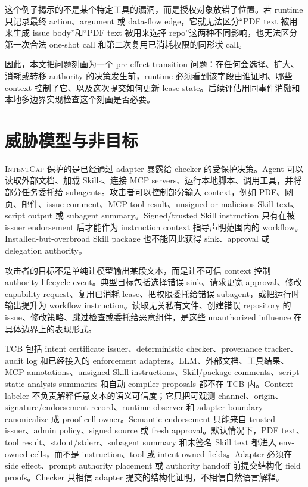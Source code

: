 \documentclass[UTF8,a4paper,11pt]{ctexart}
\newcommand{\sys}{\textsc{IntentCap}\xspace}
\begin{document}
这个例子揭示的不是某个特定工具的漏洞，而是授权对象放错了位置。若 runtime 只记录最终 action、argument 或 data-flow edge，它就无法区分“PDF text 被用来生成 issue body”和“PDF text 被用来选择 repo”这两种不同影响，也无法区分第一次合法 one-shot call 和第二次复用已消耗权限的同形状 call。

因此，本文把问题刻画为一个 pre-effect transition 问题：在任何会选择、扩大、消耗或转移 authority 的决策发生前，runtime 必须看到该字段由谁证明、哪些 context 控制了它、以及这次提交如何更新 lease state。后续评估用同事件消融和本地多边界实现检查这个刻画是否必要。

\section{威胁模型与非目标}

\sys 保护的是已经通过 adapter 暴露给 checker 的受保护决策。Agent 可以读取外部文档、加载 Skills、连接 MCP servers、运行本地脚本、调用工具，并将部分任务委托给 subagents。攻击者可以控制部分输入 context，例如 PDF、网页、邮件、issue comment、MCP tool result、unsigned or malicious Skill text、script output 或 subagent summary。Signed/trusted Skill instruction 只有在被 issuer endorsement 后才能作为 instruction context 指导声明范围内的 workflow。Installed-but-overbroad Skill package 也不能因此获得 sink、approval 或 delegation authority。

攻击者的目标不是单纯让模型输出某段文本，而是让不可信 context 控制 authority lifecycle event。典型目标包括选择错误 sink、请求更宽 approval、修改 capability request、复用已消耗 lease、把权限委托给错误 subagent，或把运行时输出提升为 workflow instruction。读取无关私有文件、创建错误 repository 的 issue、修改策略、跳过检查或委托给恶意组件，是这些 unauthorized influence 在具体边界上的表现形式。

TCB 包括 intent certificate issuer、deterministic checker、provenance tracker、audit log 和已经接入的 enforcement adapters。LLM、外部文档、工具结果、MCP annotations、unsigned Skill instructions、Skill/package comments、script static-analysis summaries 和自动 compiler proposals 都不在 TCB 内。Context labeler 不负责解释任意文本的语义可信度；它只把可观测 channel、origin、signature/endorsement record、runtime observer 和 adapter boundary canonicalize 成 proof-cell owner。Semantic endorsement 只能来自 trusted issuer、admin policy、signed source 或 fresh approval。默认情况下，PDF text、tool result、stdout/stderr、subagent summary 和未签名 Skill text 都进入 env-owned cells，而不是 instruction、tool 或 intent-owned fields。Adapter 必须在 side effect、prompt authority placement 或 authority handoff 前提交结构化 field proofs。Checker 只相信 adapter 提交的结构化证明，不相信自然语言解释。
\end{document}
